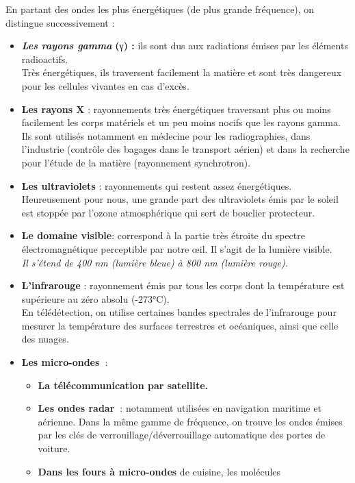 En partant des ondes les plus
énergétiques (de plus grande fréquence), on distingue successivement : 
\begin{itemize}
\item
  \emph{\textbf{Les rayons gamma }}\textbf{(}γ\textbf{) :} ils sont dus
  aux radiations émises par les éléments radioactifs.\\
  Très énergétiques, ils traversent facilement la matière et sont très
  dangereux pour les cellules vivantes en cas d'excès.\\
\item \textbf{Les rayons X}  : rayonnements très énergétiques
  traversant plus ou moins facilement les corps matériels et un peu
  moins nocifs que les rayons gamma. Ils sont utilisés notamment en
  médecine pour les radiographies, dans l'industrie (contrôle des
  bagages dans le transport aérien) et dans la recherche pour l'étude de
  la matière (rayonnement synchrotron).\\
\item \textbf{Les ultraviolets} : rayonnements qui restent
  assez énergétiques. Heureusement pour nous, une grande part des
  ultraviolets émis par le soleil est stoppée par l'ozone atmosphérique
  qui sert de bouclier protecteur.
\item \textbf{Le domaine visible}: correspond à la partie
  très étroite du spectre électromagnétique perceptible par notre œil.
  Il s'agit de la lumière visible.\\
  \emph{Il s'étend de 400 nm (lumière bleue) à 800 nm (lumière rouge).}
\item  \textbf{L'infrarouge} : rayonnement émis par tous les
  corps dont la température est supérieure au zéro absolu (-273°C).\\
  En télédétection, on utilise certaines bandes spectrales de
  l'infrarouge pour mesurer la température des surfaces terrestres et
  océaniques, ainsi que celle des nuages.
\item \textbf{Les micro-ondes~}: 
  \begin{itemize}
  \item    \textbf{La télécommunication par satellite.}
  \item    \textbf{Les ondes radar~}: notamment utilisées en navigation
    maritime et aérienne. Dans la même gamme de fréquence, on trouve les
    ondes émises par les clés de verrouillage/déverrouillage automatique
    des portes de voiture.
  \item    \textbf{Dans les fours à micro-ondes} de cuisine, les molécules

\end{itemize}
\end{itemize}
